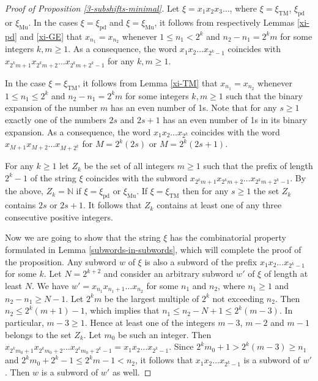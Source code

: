 \documentclass[12pt]{article}
\theoremstyle{definition}
\def\bN{\mathbb{N}}
\def\xiTM{\xi_{\mathrm{TM}}}
\def\xipd{\xi_{\mathrm{pd}}}
\def\xiGE{\xi_{\mathrm{Mu}}}
\begin{document}
\begin{proof}[Proof of Proposition \ref{3-subshifts-minimal}]
Let $\xi=x_1x_2x_3\ldots$, where $\xi=\xiTM$, $\xipd$ or $\xiGE$.  In the 
cases $\xi=\xipd$ and $\xi=\xiGE$, it follows from respectively Lemmas 
\ref{xi-pd} and \ref{xi-GE} that $x_{n_1}=x_{n_2}$ whenever $1\le n_1<2^k$ 
and $n_2-n_1=2^km$ for some integers $k,m\ge1$.  As a consequence, the word 
$x_1x_2\ldots x_{2^k-1}$ coincides with $x_{2^km+1}x_{2^km+2}\ldots 
x_{2^km+2^k-1}$ for any $k,m\ge1$.

In the case $\xi=\xiTM$, it follows from Lemma \ref{xi-TM} that 
$x_{n_1}=x_{n_2}$ whenever $1\le n_1\le2^k$ and $n_2-n_1=2^km$ for some 
integers $k,m\ge1$ such that the binary expansion of the number $m$ has an 
even number of 1s.  Note that for any $s\ge1$ exactly one of the numbers 
$2s$ and $2s+1$ has an even number of 1s in its binary expansion.  As a 
consequence, the word $x_1x_2\ldots x_{2^k}$ coincides with the word 
$x_{M+1}x_{M+2}\ldots x_{M+2^k}$ for $M=2^k(2s)$ or $M=2^k(2s+1)$.

For any $k\ge1$ let $Z_k$ be the set of all integers $m\ge1$ such that the 
prefix of length $2^k-1$ of the string $\xi$ coincides with the subword 
$x_{2^km+1}x_{2^km+2}\ldots x_{2^km+2^k-1}$.  By the above, $Z_k=\bN$ if 
$\xi=\xipd$ or $\xiGE$.  If $\xi=\xiTM$ then for any $s\ge1$ the set $Z_k$ 
contains $2s$ or $2s+1$.  It follows that $Z_k$ contains at least one of
any three consecutive positive integers.

Now we are going to show that the string $\xi$ has the combinatorial 
property formulated in Lemma \ref{subwords-in-subwords}, which will 
complete the proof of the proposition.  Any subword $w$ of $\xi$ is also a 
subword of the prefix $x_1x_2\ldots x_{2^k-1}$ for some $k$.  Let 
$N=2^{k+2}$ and consider an arbitrary subword $w'$ of $\xi$ of length at 
least $N$.  We have $w'=x_{n_1}x_{n_1+1}\ldots x_{n_2}$ for some $n_1$ and 
$n_2$, where $n_1\ge1$ and $n_2-n_1\ge N-1$.  Let $2^km$ be the largest 
multiple of $2^k$ not exceeding $n_2$.  Then $n_2\le 2^k(m+1)-1$, which 
implies that $n_1\le n_2-N+1\le2^k(m-3)$.  In particular, $m-3\ge1$.  Hence 
at least one of the integers $m-3$, $m-2$ and $m-1$ belongs to the set 
$Z_k$.  Let $m_0$ be such an integer.  Then $x_{2^km_0+1}x_{2^km_0+2}\ldots 
x_{2^km_0+2^k-1}=x_1x_2\ldots x_{2^k-1}$.  Since $2^km_0+1>2^k(m-3)\ge n_1$ 
and $2^km_0+2^k-1\le 2^km-1<n_2$, it follows that $x_1x_2\ldots x_{2^k-1}$ 
is a subword of $w'$.  Then $w$ is a subword of $w'$ as well.
\end{proof}
\end{document}
